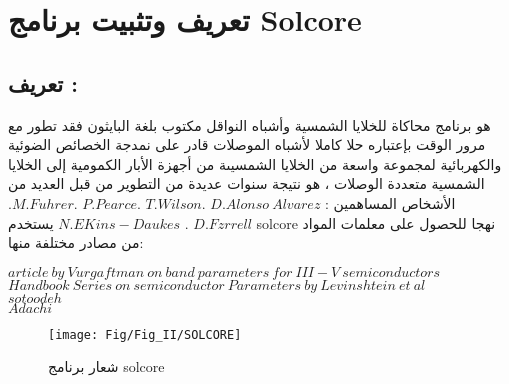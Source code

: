 \section{ تعريف وتثبيت برنامج Solcore}

\subsection{ تعريف :}
هو برنامج محاكاة للخلايا الشمسية وأشباه النواقل مكتوب بلغة البايثون فقد تطور مع مرور الوقت بإعتباره حلا كاملا لأشباه الموصلات قادر على نمدجة الخصائص الضوئية والكهربائية لمجموعة واسعة من الخلايا الشمسيىة من أجهزة الأبار الكمومية إلى الخلايا الشمسية متعددة الوصلات ، هو نتيجة سنوات عديدة من التطوير من قبل العديد من الأشخاص المساهمين : $ D. Alonso ~Alvarez $ .$ T.Wilson $ .$ P.Pearce $ .$ M. Fuhrer  $.$ D.Fzrrell $ . $ N. EKins-Daukes $
يستخدم solcore نهجا للحصول على معلمات المواد من مصادر مختلفة منها: 
\begin{flushleft}
	
	$ article~by ~Vurgaftman ~on~ band~ parameters~ for~ III-V ~semiconductors $
	\\
	$ Handbook~ Series ~on ~semiconductor~ Parameters ~by~ Levinshtein ~ et~ al $
	\\
	$ sotoodeh $ 
	\\
	$ Adachi  $  
	
\end{flushleft}

\begin{figure}[h]
	\centering
	\texttt{[image: Fig/Fig\_II/SOLCORE]}
	\caption{شعار برنامج solcore}
	\label{fig:solcore}
\end{figure}
\FloatBarrier
